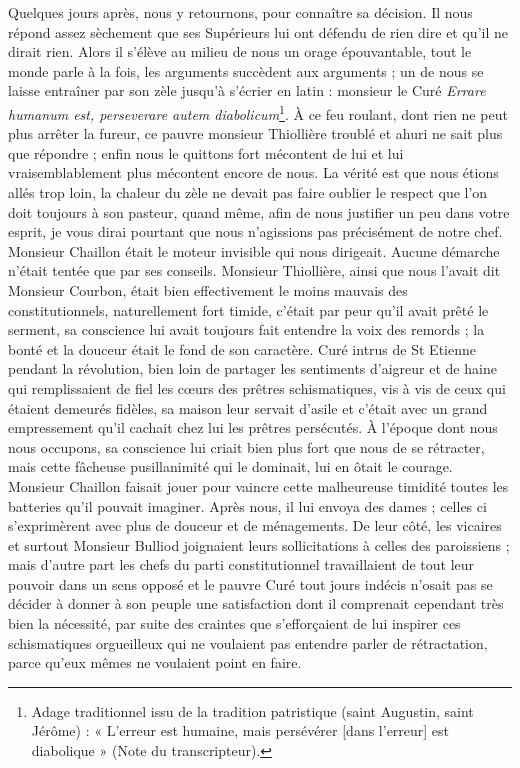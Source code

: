 \documentclass[11pt,a4paper]{report}
\begin{document}
Quelques jours après, nous y retournons, pour connaître sa décision. Il nous répond assez sèchement que ses Supérieurs lui ont défendu de rien dire et qu'il ne dirait rien. Alors il s'élève au milieu de nous un orage épouvantable, tout le monde parle à la fois, les arguments succèdent aux arguments ; un de nous se laisse entraîner par son zèle jusqu'à s'écrier en latin : monsieur le Curé \textit{Errare humanum est, perseverare autem diabolicum}\footnote{Adage traditionnel issu de la tradition patristique (saint Augustin, saint Jérôme) : « L'erreur est humaine, mais persévérer [dans l'erreur] est diabolique » (Note du transcripteur).}. À ce feu roulant, dont rien ne peut plus arrêter la fureur, ce pauvre monsieur Thiollière troublé et ahuri ne sait plus que répondre ; enfin nous le quittons fort mécontent de lui et lui vraisemblablement plus mécontent encore de nous. La vérité est que nous étions allés trop loin, la chaleur du zèle ne devait pas faire oublier le respect que l'on doit toujours à son pasteur, quand même, afin de nous justifier un peu dans votre esprit, je vous dirai pourtant que nous n'agissions pas précisément de notre chef. Monsieur Chaillon était le moteur invisible qui nous dirigeait. Aucune démarche n'était tentée que par ses conseils. Monsieur Thiollière, ainsi que nous l'avait dit Monsieur Courbon, était bien effectivement le moins mauvais des constitutionnels, naturellement fort timide, c'était par peur qu'il avait prêté le serment, sa conscience lui avait toujours fait entendre la voix des remords ; la bonté et la douceur était le fond de son caractère. Curé intrus de St Etienne pendant la révolution, bien loin de partager les sentiments d'aigreur et de haine qui remplissaient de fiel les cœurs des prêtres schismatiques, vis à vis de ceux qui étaient demeurés fidèles, sa maison leur servait d'asile et c'était avec un grand empressement qu'il cachait chez lui les prêtres persécutés. À l'époque dont nous nous occupons, sa conscience lui criait bien plus fort que nous de se rétracter, mais cette fâcheuse pusillanimité qui le dominait, lui en ôtait le courage. Monsieur Chaillon faisait jouer pour vaincre cette malheureuse timidité toutes les batteries qu'il pouvait imaginer. Après nous, il lui envoya des dames ; celles ci s'exprimèrent avec plus de douceur et de ménagements. De leur côté, les vicaires et surtout Monsieur Bulliod joignaient leurs sollicitations à celles des paroissiens ; mais d'autre part les chefs du parti constitutionnel travaillaient de tout leur pouvoir dans un sens opposé et le pauvre Curé tout jours indécis n'osait pas se décider à donner à son peuple une satisfaction dont il comprenait cependant très bien la nécessité, par suite des craintes que s'efforçaient de lui inspirer ces schismatiques orgueilleux qui ne voulaient pas entendre parler de rétractation, parce qu'eux mêmes ne voulaient point en faire.
\end{document}
